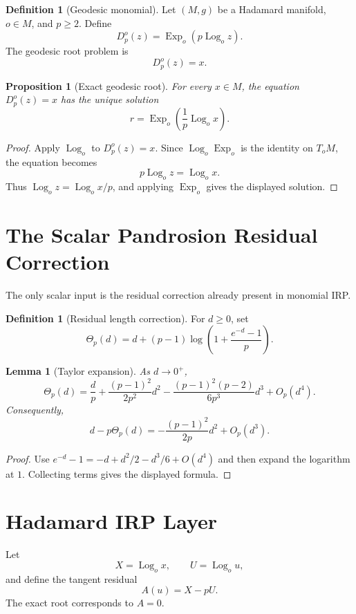 \documentclass[10pt,a4paper]{article}
\theoremstyle{plain}
\newtheorem{proposition}[theorem]{Proposition}
\newtheorem{lemma}[theorem]{Lemma}
\theoremstyle{definition}
\newtheorem{definition}[theorem]{Definition}
\newcommand{\Exp}{\operatorname{Exp}}
\newcommand{\Log}{\operatorname{Log}}
\begin{document}
\begin{definition}[Geodesic monomial]
Let $(M,g)$ be a Hadamard manifold, $o\in M$, and $p\ge2$.  Define
\[
  D_p^o(z)=\Exp_o(p\Log_o z).
\]
The geodesic root problem is
\[
  D_p^o(z)=x.
\]
\end{definition}

\begin{proposition}[Exact geodesic root]
For every $x\in M$, the equation $D_p^o(z)=x$ has the unique solution
\[
  r=\Exp_o\!\left(\frac{1}{p}\Log_o x\right).
\]
\end{proposition}

\begin{proof}
Apply $\Log_o$ to $D_p^o(z)=x$.  Since $\Log_o\Exp_o$ is the identity on
$T_oM$, the equation becomes
\[
  p\Log_o z=\Log_o x.
\]
Thus $\Log_o z=\Log_o x/p$, and applying $\Exp_o$ gives the displayed solution.
\end{proof}

\section{The Scalar Pandrosion Residual Correction}

The only scalar input is the residual correction already present in monomial
IRP.

\begin{definition}[Residual length correction]
For $d\ge0$, set
\[
  \Theta_p(d)
    =d+(p-1)\log\!\left(1+\frac{e^{-d}-1}{p}\right).
\]
\end{definition}

\begin{lemma}[Taylor expansion]
As $d\to0^+$,
\[
  \Theta_p(d)
    =\frac{d}{p}
      +\frac{(p-1)^2}{2p^2}d^2
      -\frac{(p-1)^2(p-2)}{6p^3}d^3
      +O_p(d^4).
\]
Consequently,
\[
  d-p\Theta_p(d)
    =-\frac{(p-1)^2}{2p}d^2+O_p(d^3).
\]
\end{lemma}

\begin{proof}
Use $e^{-d}-1=-d+d^2/2-d^3/6+O(d^4)$ and then expand the logarithm at $1$.
Collecting terms gives the displayed formula.
\end{proof}

\section{Hadamard IRP Layer}

Let
\[
  X=\Log_o x,\qquad U=\Log_o u,
\]
and define the tangent residual
\[
  A(u)=X-pU.
\]
The exact root corresponds to $A=0$.
\end{document}
